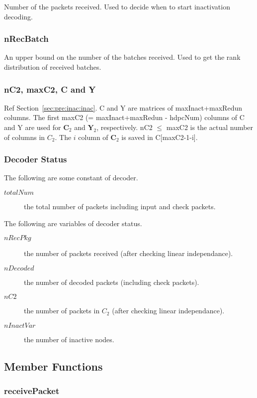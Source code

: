 \documentclass{report}
\begin{document}
Number of the packets received. Used to decide when to start
inactivation decoding.

\subsubsection{nRecBatch} \label{sec:dec:nrecbatch} 

An upper bound on the number of the batches received. 
Used to get the rank distribution of received batches.


\subsubsection{nC2, maxC2, C and Y}

Ref Section~\ref{sec:pre:inac:inac}. C and Y are matrices of
maxInact+maxRedun columns. The first maxC2 (= maxInact+maxRedun - hdpcNum) columns of C and Y are used
for $\mathbf{C}_2$ and $\mathbf{Y}_2$, respectively. nC2 $\leq$ maxC2
is the actual number of columns in $C_2$. The $i$ column of
$\mathbf{C}_2$ is saved in C[maxC2-1-i].


\subsubsection{Decoder Status}

The following are some constant of decoder.
\begin{description}
\item[$totalNum$] the total number of packets including input and check packets.
\end{description}
The following are variables of decoder status.
\begin{description}
\item[$nRecPkg$] the number of packets received (after checking linear independance).
\item[$nDecoded$] the number of decoded packets (including check packets).
\item[$nC2$] the number of packets in $C_2$ (after checking linear independance).
\item[$nInactVar$] the number of inactive nodes.
\end{description}


\subsection{Member Functions}

\subsubsection{receivePacket}
\label{sec:dec:rec}
\end{document}
